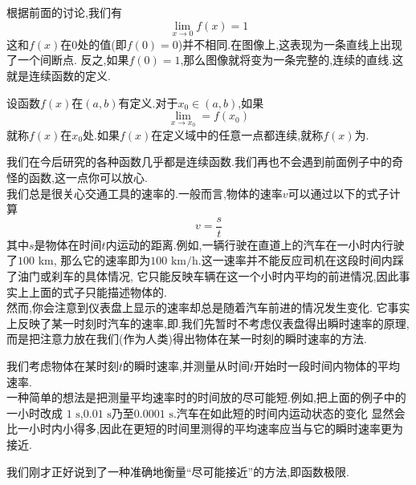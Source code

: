 \documentclass{ctexart}
\begin{document}
根据前面的讨论,我们有
\[\lim_{x\to0}f(x)=1\]
这和$f(x)$在$0$处的值(即$f(0)=0$)并不相同.在图像上,这表现为一条直线上出现了一个间断点.%
反之,如果$f(0)=1$,那么图像就将变为一条完整的,连续的直线.这就是连续函数的定义.
\begin{definition}[0A.2.3 连续函数]
    设函数$f(x)$在$(a,b)$有定义.对于$x_0\in(a,b)$,如果
    \[\lim_{x\to x_0}=f\left(x_0\right)\]
    就称$f(x)$在$x_0$处.如果$f(x)$在定义域中的任意一点都连续,就称$f(x)$为.
\end{definition}
我们在今后研究的各种函数几乎都是连续函数.我们再也不会遇到前面例子中的奇怪的函数,这一点你可以放心.\vspace{12pt}\\
\indent 我们总是很关心交通工具的速率的.一般而言,物体的速率$v$可以通过以下的式子计算
\[v=\dfrac{s}{t}\]
其中$s$是物体在时间$t$内运动的距离.例如,一辆行驶在直道上的汽车在一小时内行驶了$100\text{ km}$,%
那么它的速率即为$100\text{ km/h}$.这一速率并不能反应司机在这段时间内踩了油门或刹车的具体情况,%
它只能反映车辆在这一个小时内平均的前进情况,因此事实上上面的式子只能描述物体的.\\
\indent 然而,你会注意到仪表盘上显示的速率却总是随着汽车前进的情况发生变化.%
它事实上反映了某一时刻时汽车的速率,即.我们先暂时不考虑仪表盘得出瞬时速率的原理,%
而是把注意力放在我们(作为人类)得出物体在某一时刻的瞬时速率的方法.
\begin{derivation}
    我们考虑物体在某时刻$t$的瞬时速率,并测量从时间$t$开始时一段时间内物体的平均速率.\\
    一种简单的想法是把测量平均速率时的时间放的尽可能短.例如,把上面的例子中的一小时改成%
    $1\text{ s}$,$0.01\text{ s}$乃至$0.0001\text{ s}$.汽车在如此短的时间内运动状态的变化%
    显然会比一小时内小得多,因此在更短的时间里测得的平均速率应当与它的瞬时速率更为接近.
\end{derivation}
我们刚才正好说到了一种准确地衡量“尽可能接近”的方法,即函数极限.
\end{document}
